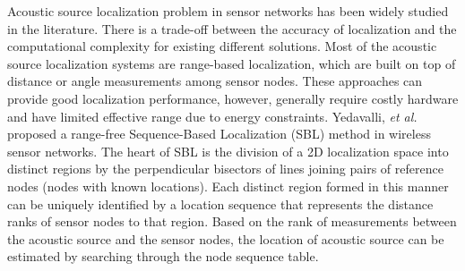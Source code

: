 Acoustic source localization problem in sensor networks has been widely studied in the literature. 
There is a trade-off between the accuracy of localization and the computational complexity for existing different solutions.
Most of the acoustic source localization systems are range-based localization, which are built on top of distance or angle measurements among sensor nodes. 
These approaches can provide good localization performance, however, generally require costly hardware and have limited effective range due to energy constraints. 
Yedavalli, \emph{et al.}~\cite{yedavalli2008sequence} proposed a range-free Sequence-Based Localization (SBL) method in wireless sensor networks. The heart of SBL is the division of a 2D localization space into distinct regions by the perpendicular bisectors of lines joining pairs of reference nodes (nodes with known locations).
Each distinct region formed in this manner can be uniquely identified by a location sequence that represents the distance ranks of sensor nodes to that region. 
Based on the rank of measurements between the acoustic source and the sensor nodes, the location of acoustic source can be estimated by searching through the node sequence table.

